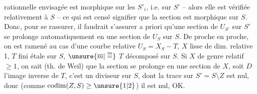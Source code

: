 rationnelle envisagée est morphique sur les $S'_i$, i.e. sur $S'$ -- alors elle est vérifiée relativement à $S$ -- ce qui est censé signifier que la section est morphique sur $S$. Donc, pour se rassurer, il faudrait s'assurer a priori qu'une section de $U_{S'}$ sur $S'$ se prolonge automatiquement en  une section de $U_S$ sur $S$. De proche en proche, on est ramené au cas d'une courbe relative $U_S=X_S-T$, $X$ lisse  de dim. relative 1, $T$ fini étale sur $S$,   $\unsure{\overline m|\overset{m}{=}}$ $T$ décomposé sur $S$. Si $X$ de genre relatif $\geq 1$, on sait (th. de Weil) que la section se prolonge en une section de $X$, soit $D$ l'image inverse de $T$, c'est un diviseur sur $S$, dont la trace sur $S'=S\setminus Z$ est nul, donc (comme $\operatorname{codim}(Z,S)\geq\unsure{1|2}$) il est nul, OK.
